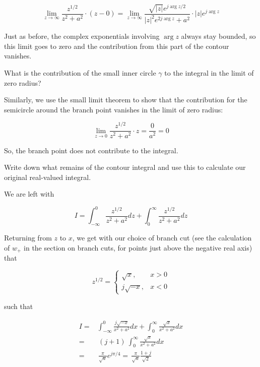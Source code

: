 \begin{equation}
\lim_{z \to \infty}\frac{z^{1/2}}{z^2+a^2} \cdot (z - 0) = \lim_{z \to
\infty}\frac{\sqrt{|z|}e^{j \arg z / 2}}{|z|^2 e^{2 j \arg z}+a^2} \cdot |z|
e^{j \arg z}
\end{equation}

Just as before, the complex exponentials involving $\arg z$ always stay bounded, so this limit goes to zero and the contribution from this part of the contour vanishes.

\begin{cue}
What is the contribution of the small inner circle $\gamma$ to the integral in the limit of zero radius?
\end{cue}

Similarly, we use the small limit theorem to show that the contribution for the semicircle around the branch point vanishes in the limit of zero radius:

\begin{equation}
\lim_{z \to 0}\frac{z^{1/2}}{z^2+a^2} \cdot z = \frac{0}{a^2} = 0
\end{equation}

So, the branch point does not contribute to the integral.

\begin{cue}
Write down what remains of the contour integral and use this to calculate our original real-valued integral.
\end{cue}

We are left with

\begin{equation}
I = \int_{- \infty}^{0}\frac{z^{1/2}}{z^2+a^2}dz + \int_{0}^{\infty}\frac{z^{1/2}}{z^2+a^2}dz
\end{equation} 

Returning from $z$ to $x$, we get with our choice of branch cut (see the calculation of $w_+$ in the section on branch cuts, for points just above the negative real axis) that

\begin{equation}
z^{1/2} = 
\begin{cases}
\sqrt{x}, & x > 0\\
j \sqrt{-x}, & x < 0
\end{cases}
\end{equation} 

such that

\begin{align}
I = & \int_{- \infty}^{0}\frac{j\sqrt{-x}}{x^2+a^2}dx +
\int_{0}^{\infty}\frac{\sqrt{x}}{x^2+a^2}dx \nonumber \\
 = & \, (j + 1) \ \int_{0}^{\infty}\frac{\sqrt{x}}{x^2+a^2}dx \nonumber \\
 = & \, \frac{\pi}{\sqrt{a}} e^{j \pi /4} = \, \frac{\pi}{\sqrt{a}} \frac{1+j}{\sqrt{2}}
\end{align} 


